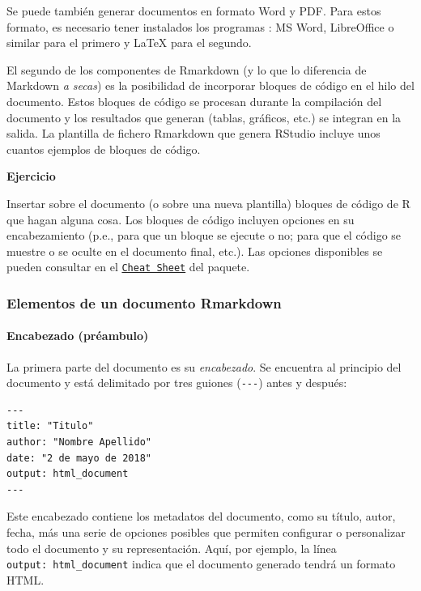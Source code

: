 \documentclass[]{article}
\let\oldparagraph\paragraph
\renewcommand{\paragraph}[1]{\oldparagraph{#1}\mbox{}}
\newcounter{ejcnt}[section]
\numberwithin{ejcnt}{section}
\newenvironment{ej}[1][]{%
	\refstepcounter{ejcnt}%
	\par\medskip%
	\noindent%
	\textbf{Ejercicio \theejcnt \;\;}%
	\rmfamily%
}{\medskip}
\begin{document}
Se puede también generar documentos en formato Word y PDF. Para estos formato, es necesario tener instalados los programas : MS Word, LibreOffice o similar para el primero y LaTeX para el segundo.

El segundo de los componentes de Rmarkdown (y lo que lo diferencia de Markdown \emph{a secas}) es la posibilidad de incorporar bloques de código en el hilo del documento. Estos bloques de código se procesan durante la compilación del documento y los resultados que generan (tablas, gráficos, etc.) se integran en la salida. La plantilla de fichero Rmarkdown que genera RStudio incluye unos cuantos ejemplos de bloques de código.

\begin{ej}
Insertar sobre el documento (o sobre una nueva plantilla) bloques de
código de R que hagan alguna cosa. Los bloques de código incluyen
opciones en su encabezamiento (p.e., para que un bloque se ejecute o no;
para que el código se muestre o se oculte en el documento final, etc.).
Las opciones disponibles se pueden consultar en el
\href{https://www.rstudio.com/wp-content/uploads/2015/02/rmarkdown-cheatsheet.pdf}{\texttt{Cheat\ Sheet}}
del paquete.
\end{ej}

\hypertarget{elementos-de-un-documento-rmarkdown}{%
\subsubsection{Elementos de un documento Rmarkdown}\label{elementos-de-un-documento-rmarkdown}}

\hypertarget{encabezado-preambulo}{%
\paragraph{Encabezado (préambulo)}\label{encabezado-preambulo}}

La primera parte del documento es su \emph{encabezado}. Se encuentra al principio del documento y está delimitado por tres guiones (\texttt{-\/-\/-}) antes y después:

\begin{verbatim}
---
title: "Titulo"
author: "Nombre Apellido"
date: "2 de mayo de 2018"
output: html_document
---
\end{verbatim}

Este encabezado contiene los metadatos del documento, como su título, autor, fecha, más una serie de opciones posibles que permiten configurar o personalizar todo el documento y su representación. Aquí, por ejemplo, la línea \texttt{output:\ html\_document} indica que el documento generado tendrá un formato HTML.
\end{document}
